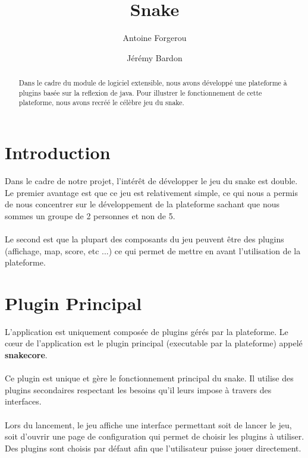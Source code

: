 \documentclass[12pt,a4paper]{article}
\title{Snake}
\author{Antoine Forgerou \and Jérémy Bardon}
\date{}
\begin{document}
\maketitle
\tableofcontents

\newpage

\begin{abstract}
    Dans le cadre du module de logiciel extensible, nous avons développé 
    une plateforme à plugins basée sur la reflexion de java. 
    Pour illustrer le fonctionnement de cette plateforme, nous avons recréé 
    le célèbre jeu du snake.
\end{abstract} 

\section{Introduction}
Dans le cadre de notre projet, l'intérêt de développer le jeu du snake est double. 
Le premier avantage est que ce jeu est relativement simple, ce qui nous a permis de nous 
concentrer sur le développement de la plateforme sachant que nous sommes un groupe de 2 personnes
et non de 5. 
\\\\
Le second est que la plupart des composants du jeu peuvent être des plugins 
(affichage, map, score, etc ...) ce qui permet de mettre en avant l'utilisation 
de la plateforme.
    
\section{Plugin Principal}    
L'application est uniquement composée de plugins gérés par la plateforme. Le cœur 
de l'application est le plugin principal (executable par la plateforme) appelé \textbf{snakecore}. 
\\\\
Ce plugin est unique et gère le fonctionnement principal du snake. Il utilise 
des plugins secondaires respectant les besoins qu'il leurs impose à travers des 
interfaces.
\\\\
Lors du lancement, le jeu affiche une interface permettant soit de lancer le jeu, 
soit d'ouvrir une page de configuration qui permet de choisir les plugins à utiliser. 
Des plugins sont choisis par défaut afin que l'utilisateur puisse jouer directement. 
\end{document}

